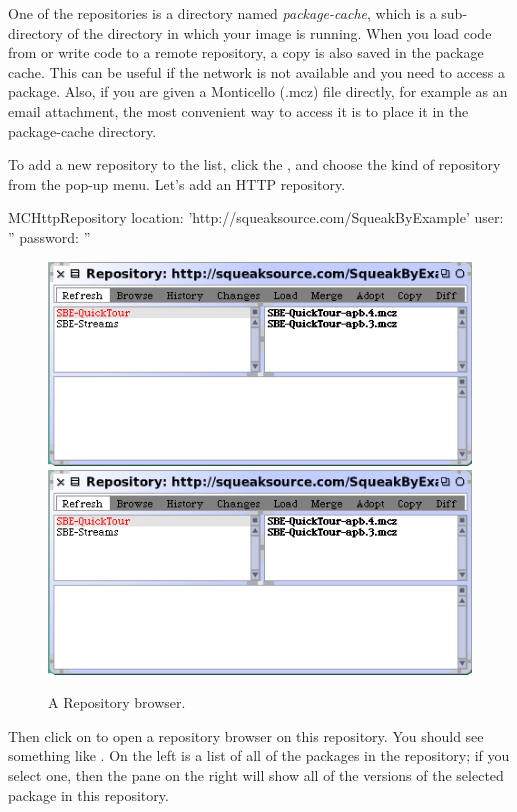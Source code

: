 \documentclass[a4paper,10pt,twoside]{book}
\begin{document}
One of the repositories is a directory named \emph{package-cache}, which is a sub-directory of the directory in which your image is running.  
When you load code from or write code to a remote repository, a copy is also saved in the package cache.  This can be useful if the network is not available and you need to access a package.  Also, if you are given a Monticello (.mcz) file directly, for example as an email attachment, the most convenient way to access it is to place it in the package-cache directory.

To add a new repository to the list, click the , and choose the kind of repository from the pop-up menu.  Let's add an HTTP repository.

\begin{code}{}
MCHttpRepository
	location: 'http://squeaksource.com/SqueakByExample'
	user: ''
	password: ''
\end{code}

\begin{figure}[btp]
	\begin{center}
	\ifluluelse
		{\includegraphics[scale=0.65]{SqueakSource-SBE}}
		{\includegraphics[scale=0.7]{SqueakSource-SBE}}
	\end{center}
	\caption{A Repository browser.}
	\label{fig:SqueakSource:SBE}
\end{figure}
\noindent
Then click on  to open a repository browser on this repository.  You should see something like .  On the left is a list of all of the packages in the repository; if you select one, then the pane on the right will show all of the versions of the selected package in this repository. 
\end{document}
